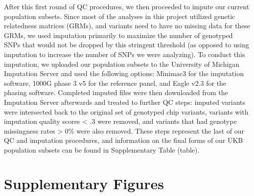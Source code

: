 \documentclass[12pt, a4paper]{article}
\begin{document}
After this first round of QC procedures, we then proceeded to impute our current population subsets. Since most of the analyses in this project utilized genetic relatedness matrices (GRMs), and variants need to have no missing data for these GRMs, we used imputation primarily to maximize the number of genotyped SNPs that would not be dropped by this stringent threshold (as opposed to using imputation to increase the number of SNPs we were analyzing). To conduct this imputation, we uploaded our population subsets to the University of Michigan Imputation Server \citep{Das2016} and used the following options: Minimac3 for the imputation software, 1000G phase 3 v5 for the reference panel, and Eagle v2.3 for the phasing software. Completed imputed files were then downloaded from the Imputation Server afterwards and treated to further QC steps: imputed variants were intersected back to the original set of genotyped chip variants, variants with imputation quality scores < .3 were removed, and variants that had genotype missingness rates > 0\% were also removed. These steps represent the last of our QC and imputation procedures, and information on the final forms of our UKB population subsets can be found in Supplementary Table (table).

\clearpage


\section{Supplementary Figures}\label{Supplementary-Figures}
\end{document}
